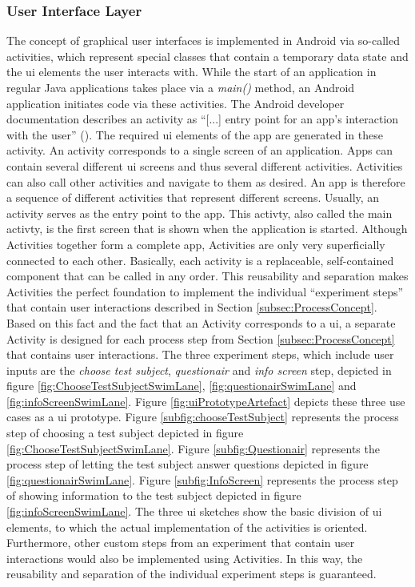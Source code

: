 \subsubsection{User Interface Layer}

The concept of graphical user interfaces is implemented in Android via so-called activities, which represent special classes that contain a temporary data state and the \ac{ui} elements the user interacts with. While the start of an application in regular Java applications takes place via a \textit{main()} method, an Android application initiates code via these activities. The Android developer documentation describes an activity as \enquote{[...] entry point for an app's interaction with the user} (\cite{Google.2023}). The required \ac{ui} elements of the app are generated in these activity. An activity corresponds to a single screen of an application. Apps can contain several different \ac{ui} screens and thus several different activities. Activities can also call other activities and navigate to them as desired. An app is therefore a sequence of different activities that represent different screens. Usually, an activity serves as the entry point to the app. This activty, also called the main activty, is the first screen that is shown when the application is started. Although Activities together form a complete app, Activities are only very superficially connected to each other. Basically, each activity is a replaceable, self-contained component that can be called in any order. This reusability and separation makes Activities the perfect foundation to implement the individual \enquote{experiment steps} that contain user interactions described in Section \ref{subsec:ProcessConcept}. Based on this fact and the fact that an Activity corresponds to a \ac{ui}, a separate Activity is designed for each process step from Section \ref{subsec:ProcessConcept} that contains user interactions. The three experiment steps, which include user inputs are the \textit{choose test subject}, \textit{questionair} and \textit{info screen} step, depicted in figure \ref{fig:ChooseTestSubjectSwimLane}, \ref{fig:questionairSwimLane} and \ref{fig:infoScreenSwimLane}. Figure \ref{fig:uiPrototypeArtefact} depicts these three use cases as a \ac{ui} prototype. Figure \ref{subfig:chooseTestSubject} represents the process step of choosing a test subject depicted in figure \ref{fig:ChooseTestSubjectSwimLane}. Figure \ref{subfig:Questionair} represents the process step of letting the test subject answer questions depicted in figure \ref{fig:questionairSwimLane}. Figure \ref{subfig:InfoScreen}  represents the process step of showing information to the test subject depicted in figure \ref{fig:infoScreenSwimLane}. The three \ac{ui} sketches show the basic division of \ac{ui} elements, to which the actual implementation of the activities is oriented. Furthermore, other custom steps from an experiment that contain user interactions would also be implemented using Activities. In this way, the reusability and separation of the individual experiment steps is guaranteed.


